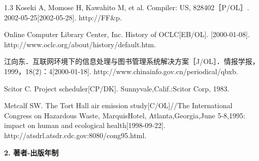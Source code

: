 \documentclass[UTF8, scheme=chinese, openany, oneside]{ctexbook}
\begin{document}
\begin{spacing}{1.3}
\vspace{0.2cm}
\noindent [13] Koseki A, Momose H, Kawahito M, et al. Compiler: US, 828402［P/OL］. 2002-05-25[2002-05-28]. http://FF\&p.

\vspace{0.2cm}
\noindent [14] Online Computer Library Center, Inc. History of OCLC[EB/OL]. [2000-01-08]. http://www.oclc.org/about/history/default.htm.

\vspace{0.2cm}
\noindent [15] 江向东．互联网环境下的信息处理与图书管理系统解决方案［J/OL］．情报学报，1999，18(2)：4[2000-01-18]. http://www.chinainfo.gov.cn/periodical/qbxb.

\vspace{0.2cm}
\noindent [16] Scitor C. Project scheduler[CP/DK]. Sunnyvale,Calif.:Scitor Corp, 1983.

\vspace{0.2cm}
\noindent [17] Metcalf SW. The Tort Hall air emission study[C/OL]//The International Congress on Hazardous Waste, MarquisHotel, Atlanta,Georgia,June 5-8,1995: impact on human and ecological health[1998-09-22]. http://atsdrl.atsdr.cdc.gov:8080/cong95.html.
\end{spacing}

\vspace{0.5cm}
\noindent {}\textbf{2. 著者-出版年制}
\end{document}
